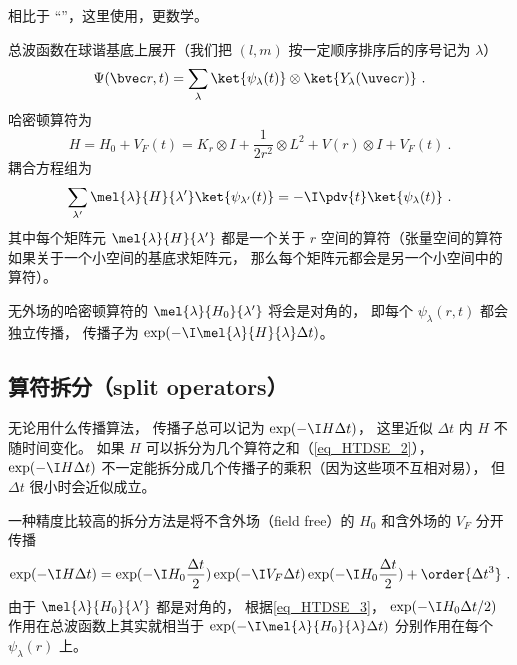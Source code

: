 
\begin{issues}
\issueDraft
\end{issues}


相比于 “”，这里使用，更数学。

总波函数在球谐基底上展开（我们把 $(l,m)$ 按一定顺序排序后的序号记为 $\lambda$）
\begin{equation}\label{eq_HTDSE_1}
\Psi(\bvec r, t) = \sum_\lambda \ket{\psi_\lambda(t)} \otimes \ket{Y_\lambda(\uvec r)}~.
\end{equation}
哈密顿算符为
\begin{equation}\label{eq_HTDSE_2}
H = H_0 + V_F(t) = K_r\otimes I + \frac{1}{2r^2}\otimes L^2 + V(r) \otimes I + V_F(t)~.
\end{equation}
耦合方程组为
\begin{equation}\label{eq_HTDSE_3}
\sum_{\lambda'} \mel{\lambda}{H}{\lambda'} \ket{\psi_{\lambda'}(t)} = -\I\pdv{t} \ket{\psi_\lambda(t)}~.
\end{equation}
其中每个矩阵元 $ \mel{\lambda}{H}{\lambda'}$ 都是一个关于 $r$ 空间的算符（张量空间的算符如果关于一个小空间的基底求矩阵元， 那么每个矩阵元都会是另一个小空间中的算符）。

无外场的哈密顿算符的 $\mel{\lambda}{H_0}{\lambda'}$ 将会是对角的， 即每个 $\psi_{\lambda}(r, t)$ 都会独立传播， 传播子为 $\exp(-\I \mel{\lambda}{H}{\lambda} \Delta t)$。

\subsection{算符拆分（split operators）}
无论用什么传播算法， 传播子总可以记为 $\exp(-\I H \Delta t)$， 这里近似 $\Delta t$ 内 $H$ 不随时间变化。 如果 $H$ 可以拆分为几个算符之和（\autoref{eq_HTDSE_2}）， $\exp(-\I H \Delta t)$ 不一定能拆分成几个传播子的乘积（因为这些项不互相对易）， 但 $\Delta t$ 很小时会近似成立。

一种精度比较高的拆分方法是将不含外场（field free）的 $H_0$ 和含外场的 $V_F$ 分开传播
\begin{equation}
\exp(-\I H\Delta t) = \exp(-\I H_0\frac{\Delta t}{2})\exp(-\I V_F\Delta t) \exp(-\I H_0\frac{\Delta t}{2}) + \order{\Delta t^3}~.
\end{equation}
由于 $\mel{\lambda}{H_0}{\lambda'}$ 都是对角的， 根据\autoref{eq_HTDSE_3}， $\exp(-\I H_0 \Delta t/2)$ 作用在总波函数上其实就相当于 $\exp(-\I\mel{\lambda}{H_0}{\lambda} \Delta t)$ 分别作用在每个 $\psi_{\lambda}(r)$ 上。

